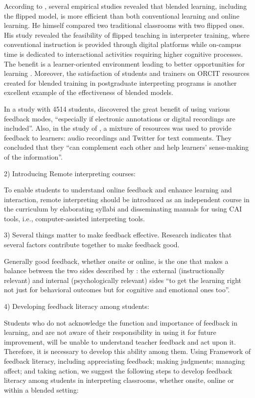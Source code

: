 \documentclass[english]{textolivre}
\begin{document}
According to \textcite[p. 39]{kim_flipped_2017}, several empirical studies revealed that blended learning, including the flipped model, is more efficient than both conventional learning and online learning. He himself compared two traditional classrooms with two flipped ones. His study revealed the feasibility of flipped teaching in interpreter training, where conventional instruction is provided through digital platforms while on-campus time is dedicated to interactional activities requiring higher cognitive processes. The benefit is a learner-oriented environment leading to better opportunities for learning \cite[p. 38-39]{kim_flipped_2017}. Moreover, the satisfaction of students and trainers on ORCIT resources created for blended training in postgraduate interpreting programs \cite[p. 3]{carsten_challenge_2021} is another excellent example of the effectiveness of blended models.  

In a study with 4514 students, \textcite[p. 1519]{ryan_feedback_2019} discovered the great benefit of using various feedback modes, “especially if electronic annotations or digital recordings are included”. Also, in the study of \textcite[p. 1410]{henderson_conditions_2019}, a mixture of resources was used to provide feedback to learners: audio recordings and Twitter for text comments. They concluded that they “can complement each other and help learners’ sense-making of the information”.

2) Introducing Remote interpreting courses:

To enable students to understand online feedback and enhance learning and interaction, remote interpreting should be introduced as an independent course in the curriculum \cite[p. 8-11]{karaban_exploring_2021} by elaborating syllabi and disseminating manuals for using CAI tools, i.e., computer-assisted interpreting tools.

3) Several things matter to make feedback effective.
Research indicates that several factors contribute together to make feedback good.  

Generally good feedback, whether onsite or online, is the one that makes a balance between the two sides described by \textcite[p. 811]{leighton_students_2019}: the external (instructionally relevant) and internal (psychologically relevant) sides “to get the learning right not just for behavioral outcomes but for cognitive and emotional ones too”.

4) Developing feedback literacy among students:

Students who do not acknowledge the function and importance of feedback in learning, and are not aware of their responsibility in using it for future improvement, will be unable to understand teacher feedback and act upon it. Therefore, it is necessary to develop this ability among them. Using  Framework of feedback literacy, including appreciating feedback; making judgments; managing affect; and taking action, we suggest the following steps to develop feedback literacy among students in interpreting classrooms, whether onsite, online or within a blended setting:
\end{document}
